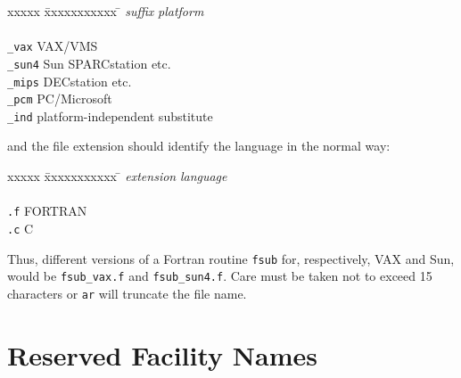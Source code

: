 \documentclass[twoside,11pt,nolof,noabs]{starlink}
\renewcommand{\_}{{\tt\char'137}}
\begin{document}
\begin{itemize}
   \begin{tabbing}
   xxxxx \= xxxxxxxxxxx \= \kill
     \> \textit{suffix} \> \textit{platform} \\ \\
     \> \verb|_vax| \> VAX/VMS \\
     \> \verb|_sun4| \> Sun SPARCstation etc. \\
     \> \verb|_mips| \> DECstation etc. \\
     \> \verb|_pcm| \> PC/Microsoft \\
     \> \verb|_ind| \> platform-independent substitute
   \end{tabbing}

   and the file extension should identify the language in the normal way:
   \begin{tabbing}
   xxxxx \= xxxxxxxxxxx \= \kill
     \> \textit{extension} \> \textit{language} \\ \\
     \> \verb|.f| \> FORTRAN \\
     \> \verb|.c| \> C
   \end{tabbing}

   Thus, different versions of a Fortran routine \verb|fsub|
   for, respectively, VAX and Sun, would be \verb|fsub_vax.f|
   and \verb|fsub_sun4.f|.  Care must be taken not to exceed
   15 characters or \verb|ar| will truncate the file name.
\end{itemize}

\newpage
\appendix
\section{Reserved Facility Names}
\end{document}
